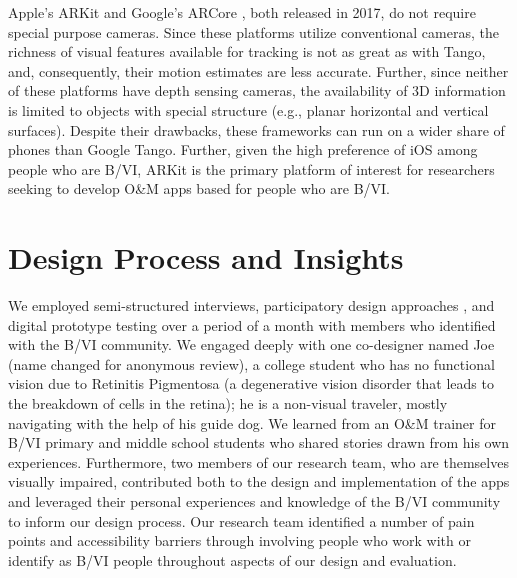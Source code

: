 \documentclass[chi_draft]{sigchi}
\newcommand{\BVI}{B/VI\xspace}
\newcommand{\OM}{O\&M\xspace}
\begin{document}
Apple's ARKit \cite{arkit} and Google's ARCore \cite{arcore}, both released in 2017, do not require special purpose cameras.  Since these platforms utilize conventional cameras, the richness of visual features available for tracking is not as great as with Tango, and, consequently, their motion estimates are less accurate.  Further, since neither of these platforms have depth sensing cameras, the availability of 3D information is limited to objects with special structure (e.g., planar horizontal and vertical surfaces).  Despite their drawbacks, these frameworks can run on a wider share of phones than Google Tango.  Further, given the high preference of iOS among people who are \BVI \cite{morris2014blind}, ARKit is the primary platform of interest for researchers seeking to develop \OM apps based for people who are \BVI.


\section{Design Process and Insights}
We employed semi-structured interviews, participatory design approaches \cite{buhler2001empowered, schuler1993participatory}, and digital prototype testing over a period of a month with members who identified with the \BVI community.  We engaged deeply with one co-designer named Joe (name changed for anonymous review), a college student who has no functional vision due to Retinitis Pigmentosa (a degenerative vision disorder that leads to the breakdown of cells in the retina); he is a non-visual traveler, mostly navigating with the help of his guide dog. We learned from an \OM trainer for \BVI primary and middle school students who shared stories drawn from his own experiences. Furthermore, two members of our research team, who are themselves visually impaired, contributed both to the design and implementation of the apps and leveraged their personal experiences and knowledge of the \BVI community to inform our design process. Our research team identified a number of pain points and accessibility barriers through involving people who work with or identify as \BVI people throughout aspects of our design and evaluation.
\end{document}
